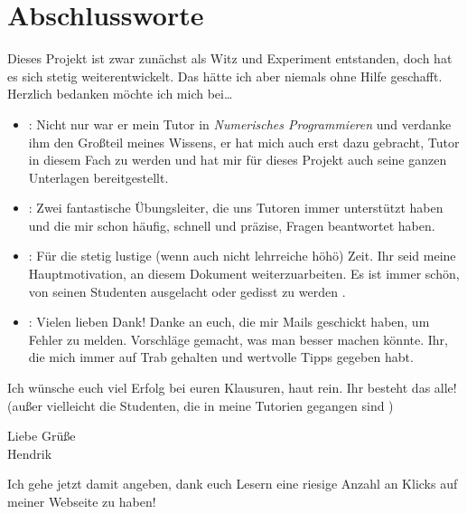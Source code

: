 \newpage

\section{Abschlussworte}
	\large

	Dieses Projekt ist zwar zunächst als Witz und Experiment entstanden, doch hat es sich stetig weiterentwickelt. Das hätte ich aber niemals ohne Hilfe geschafft.
	\n 
	Herzlich bedanken möchte ich mich bei\dots
	\vfill
	\begin{itemize}
		\item {}: \n
			Nicht nur war er mein Tutor in \textit{Numerisches Programmieren} und verdanke ihm den Großteil meines Wissens, er hat mich auch erst dazu gebracht, Tutor in diesem Fach zu werden und hat mir für dieses Projekt auch seine ganzen Unterlagen bereitgestellt.
			\vfill
		\item {}: \n
			Zwei fantastische Übungsleiter, die uns Tutoren immer unterstützt haben und die mir schon häufig, schnell und präzise, Fragen beantwortet haben.
			\vfill
		\item {}: \n
			Für die stetig lustige (wenn auch nicht lehrreiche höhö) Zeit. Ihr seid meine Hauptmotivation, an diesem Dokument weiterzuarbeiten. Es ist immer schön, von seinen Studenten ausgelacht oder gedisst zu werden \Laughey.
			\vfill
		\item {}: \n
			Vielen lieben Dank! Danke an euch, die mir Mails geschickt haben, um Fehler zu melden. Vorschläge gemacht, was man besser machen könnte. Ihr, die mich immer auf Trab gehalten und wertvolle Tipps gegeben habt. 
	\end{itemize}
	\large
	\vfill
	
	\noindent Ich wünsche euch viel Erfolg bei euren Klausuren, haut rein. Ihr besteht das alle! 
	\\ (außer vielleicht die Studenten, die in meine Tutorien gegangen sind \Innocey)
	\vfill
	
	\noindent Liebe Grüße \\
	Hendrik
	\vfill
	
	\small \noindent Ich gehe jetzt damit angeben, dank euch Lesern eine riesige Anzahl an Klicks auf meiner Webseite zu haben! \Cooley